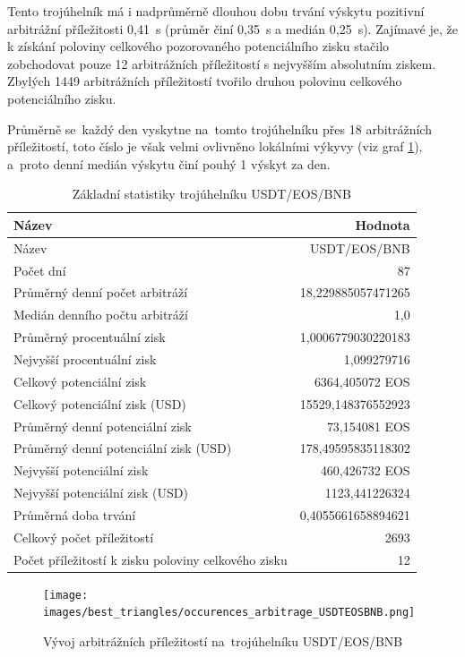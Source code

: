 \documentclass[thesis=B,czech]{FITthesis}[2019/03/21]
\begin{document}
Tento trojúhelník má i nadprůměrně dlouhou dobu trvání výskytu pozitivní arbitrážní příležitosti 0,41~s (průměr činí 0,35~s a medián 0,25~s). Zajímavé je, že k získání poloviny celkového pozorovaného potenciálního zisku stačilo zobchodovat pouze 12 arbitrážních příležitostí s nejvyšším absolutním ziskem. Zbylých 1449 arbitrážních příležitostí tvořilo druhou polovinu celkového potenciálního zisku.

Průměrně se~každý den vyskytne na~tomto trojúhelníku přes 18 arbitrážních příležitostí, toto číslo je však velmi ovlivněno lokálními výkyvy (viz graf \ref{occurences_arbitrage_USDTEOSBN}), a~proto denní medián výskytu činí pouhý 1 výskyt za den.

\begin{table}\centering
\caption{Základní statistiky trojúhelníku USDT/EOS/BNB}
\label{USDTEOSBNB_stats}
\begin{tabular}{|| l | r ||}
\hline Název & Hodnota \\ 
\hline\hline Název & USDT/EOS/BNB \\ 
\hline Počet dní & 87 \\ 
\hline Průměrný denní počet arbitráží & 18,229885057471265 \\ 
\hline Medián denního počtu arbitráží & 1,0 \\ 
\hline Průměrný procentuální zisk & 1,0006779030220183 \\ 
\hline Nejvyšší procentuální zisk & 1,099279716 \\ 
\hline Celkový potenciální zisk & 6364,405072 EOS \\ 
\hline Celkový potenciální zisk (USD) & 15529,148376552923 \\ 
\hline Průměrný denní potenciální zisk & 73,154081 EOS \\ 
\hline Průměrný denní potenciální zisk (USD) & 178,49595835118302 \\ 
\hline Nejvyšší potenciální zisk & 460,426732 EOS \\ 
\hline Nejvyšší potenciální zisk (USD) & 1123,441226324 \\ 
\hline Průměrná doba trvání & 0,4055661658894621 \\ 
\hline Celkový počet příležitostí & 2693 \\ 
\hline Počet příležitostí k zisku poloviny celkového zisku & 12 \\ 
\hline
\end{tabular}
\end{table}

\begin{figure}\centering
	\texttt{[image: images/best\_triangles/occurences\_arbitrage\_USDTEOSBNB.png]}
	\caption{Vývoj arbitrážních příležitostí na~trojúhelníku USDT/EOS/BNB }\label{occurences_arbitrage_USDTEOSBN}
\end{figure}
\end{document}
